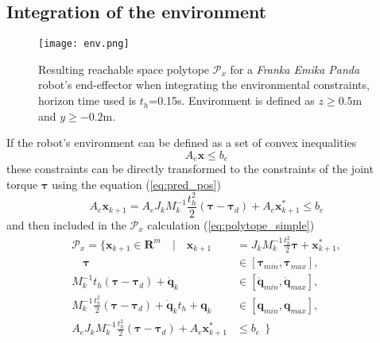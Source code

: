 
\vspace{-0.2cm}
\subsection{Integration of the environment}

\begin{figure}[!t]
    \centering
    \texttt{[image: env.png]}
    \caption{Resulting reachable space polytope $\mathcal{P}_x$ for a \textit{Franka Emika Panda} robot's end-effector when integrating the environmental constraints, horizon time used is $t_h$=0.15s. Environment is defined as $z\geq0.5$m and $y\geq-0.2$m.}
    \label{fig:env}
    \vspace{-0.5cm}
\end{figure}

If the robot's environment can be defined as a set of convex inequalities
\begin{equation}
    A_e \bm{x} \leq b_e
\end{equation}
these constraints can be directly transformed to the constraints of the joint torque $\bm{\tau}$ using the equation (\ref{eq:pred_pos})
\begin{equation}
    A_e\bm{x}_{k+1} = A_e J_k M_k^{-1}\frac{t_h^2}{2} (\bm{\tau} -\bm{\tau}_d) + A_e \bm{x}^*_{k+1} \leq b_e
    \label{eq:env_limits}
\end{equation}
and then included in the $\mathcal{P}_x$ calculation (\ref{eq:polytope_simple})
\begin{equation}
\begin{split}
    \mathcal{P}_x = \{ \bm{x}_{k+1} \in \mathbf{R}^m \quad| \quad \bm{x}_{k+1} &= J_k M_k^{-1}\frac{t_h^2}{2}\bm{\tau} + \bm{x}^*_{k+1},\\
   \quad \bm{\tau} &\in \left[\bm{\tau}_{min},\bm{\tau}_{max}\right],\\
    M_k^{-1}t_h (\bm{\tau} -\bm{\tau}_d)+ \dot{\bm{q}}_{k} &\in \left[\dot{\bm{q}}_{min},\dot{\bm{q}}_{max}\right],\\
   M_k^{-1}\frac{t_h^2}{2}(\bm{\tau} -\bm{\tau}_d) +  \dot{\bm{q}}_{k}t_h + \bm{q}_{k} &\in \left[\bm{q}_{min},\bm{q}_{max}\right],\\
   A_e J_k M_k^{-1}\frac{t_h^2}{2} (\bm{\tau} -\bm{\tau}_d) + A_e \bm{x}^*_{k+1} &\leq b_e ~~\}
\end{split} 
\label{eq:env}
\end{equation}

